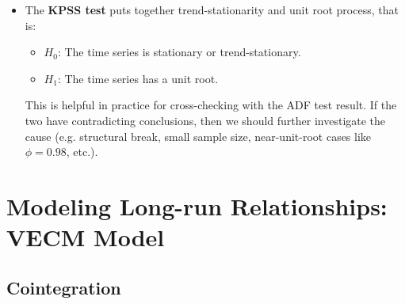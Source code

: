 \documentclass[notitlepage]{article}
\begin{document}
\begin{itemize}
    \item The \textbf{KPSS test} puts together trend-stationarity and unit root process, that is:
    \begin{itemize}
        \item \(H_0\): The time series is stationary or trend-stationary.
        \item \(H_1\): The time series has a unit root.
    \end{itemize}
    This is helpful in practice for cross-checking with the ADF test result. If the two have contradicting conclusions, then we should further investigate the cause (e.g. structural break, small sample size, near-unit-root cases like \(\phi = 0.98\), etc.). 
    
\end{itemize}

\section{Modeling Long-run Relationships: VECM Model}

\subsection{Cointegration}
\end{document}
